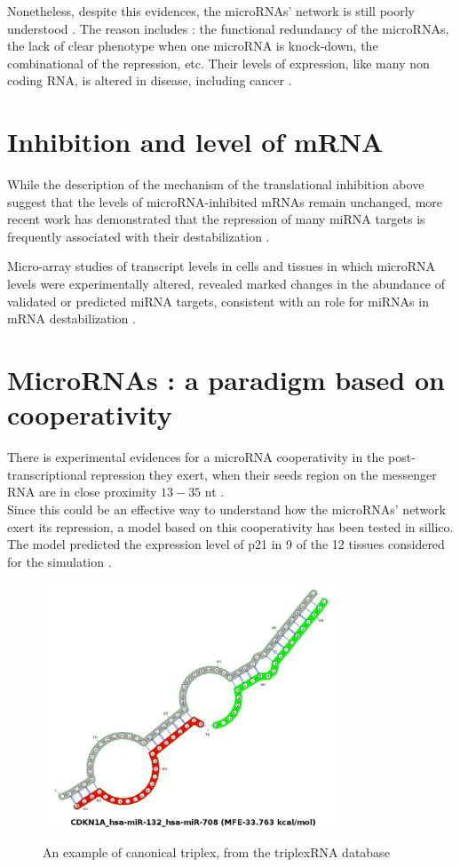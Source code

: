 \documentclass[a4paper,12pt]{report}
\begin{document}
Nonetheless, despite this evidences, the microRNAs' network is still poorly understood \cite{network,cancer}. The reason includes : the functional redundancy of the microRNAs, the lack of clear phenotype when one microRNA is knock-down, the combinational of the repression, etc\cite{network,cancer}. 
Their levels of expression, like many non coding RNA, is altered in disease, including cancer \cite{cancer}.

\section{Inhibition and level of mRNA}

While the description of the mechanism of the translational inhibition above suggest that the levels of microRNA-inhibited mRNAs remain unchanged, more recent work has demonstrated that the repression of many miRNA targets is frequently associated with their destabilization \cite{cancer}.

Micro-array studies of transcript levels in cells and tissues
in which microRNA levels were experimentally altered, revealed marked changes in the abundance of validated or predicted miRNA targets, consistent with an role for miRNAs in mRNA destabilization \cite{cancer}.

\section{MicroRNAs : a paradigm based on cooperativity}

There is experimental evidences for a microRNA cooperativity in the post-transcriptional repression they exert, when their seeds region on the messenger RNA are in close proximity $13\!- \!35$ nt \cite{site, coop}.\\
 Since this could be an effective way to understand how the microRNAs' network exert its repression, a model based on this cooperativity has been tested in sillico. The model predicted the expression level of p21 in 9 of the 12 tissues considered for the simulation \cite{p21}.
\begin{figure}[H]
	\centering
	{\includegraphics[width=0.8\textwidth]{canonical.png}}
	\caption{An example of canonical triplex, from the triplexRNA database}
\end{figure}
\end{document}
